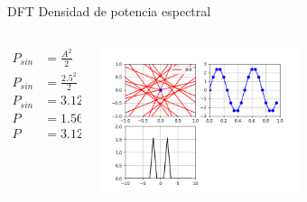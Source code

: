  \begin{frame}{DFT}{ Densidad de potencia espectral }
    \handsonicon
    \begin{columns}[c]
       \begin{column}{.2\textwidth}
          \begin{align*}
             P_{sin}&=\frac{A^2}{2}\\
             P_{sin}&=\frac{2.5^2}{2}\\
             P_{sin}&=3.125W\\
             P&=1.56+1.56\\
             P&=3.125W
          \end{align*}
       \end{column}
       \begin{column}{.8\textwidth}
          \centering\includegraphics[width=0.55\textwidth]{3_clase/densidad_potencia}
       \end{column}
    \end{columns}
    \vfill
 \end{frame}
